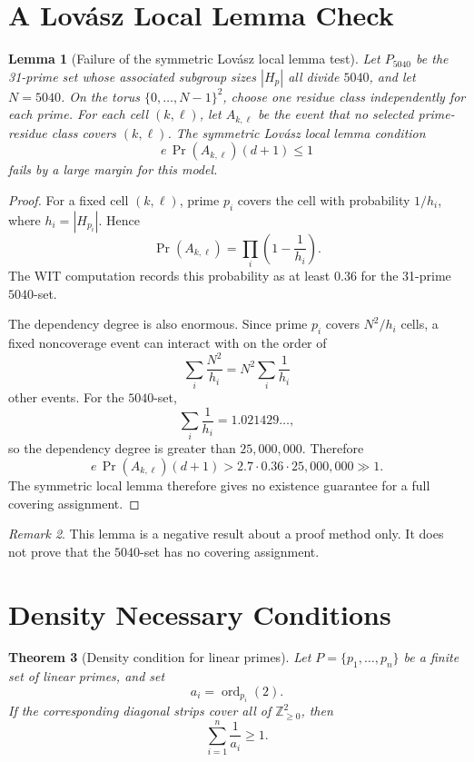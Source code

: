 \documentclass[11pt]{article}
\newtheorem{theorem}{Theorem}[section]
\newtheorem{lemma}[theorem]{Lemma}
\theoremstyle{definition}
\theoremstyle{remark}
\newtheorem{remark}[theorem]{Remark}
\DeclareMathOperator{\ord}{ord}
\begin{document}
\section{A Lov\'asz Local Lemma Check}

\begin{lemma}[Failure of the symmetric Lov\'asz local lemma test]
Let \(P_{5040}\) be the 31-prime set whose associated subgroup sizes
\(|H_p|\) all divide \(5040\), and let \(N=5040\).  On the torus
\(\{0,\ldots,N-1\}^2\), choose one residue class independently for each prime.
For each cell \((k,\ell)\), let \(A_{k,\ell}\) be the event that no selected
prime-residue class covers \((k,\ell)\).  The symmetric Lov\'asz local lemma
condition
\[
        e\,\Pr(A_{k,\ell})(d+1)\leq 1
\]
fails by a large margin for this model.
\end{lemma}

\begin{proof}
For a fixed cell \((k,\ell)\), prime \(p_i\) covers the cell with probability
\(1/h_i\), where \(h_i=|H_{p_i}|\).  Hence
\[
        \Pr(A_{k,\ell})
        =
        \prod_i\left(1-\frac1{h_i}\right).
\]
The WIT computation records this probability as at least \(0.36\) for the
31-prime \(5040\)-set.

The dependency degree is also enormous.  Since prime \(p_i\) covers
\(N^2/h_i\) cells, a fixed noncoverage event can interact with on the order of
\[
        \sum_i \frac{N^2}{h_i}
        =
        N^2\sum_i \frac1{h_i}
\]
other events.  For the \(5040\)-set,
\[
        \sum_i \frac1{h_i}=1.021429\ldots,
\]
so the dependency degree is greater than \(25{,}000{,}000\).  Therefore
\[
        e\,\Pr(A_{k,\ell})(d+1)
        >
        2.7\cdot 0.36\cdot 25{,}000{,}000
        \gg 1.
\]
The symmetric local lemma therefore gives no existence guarantee for a full
covering assignment.
\end{proof}

\begin{remark}
This lemma is a negative result about a proof method only.  It does not prove
that the \(5040\)-set has no covering assignment.
\end{remark}

\section{Density Necessary Conditions}

\begin{theorem}[Density condition for linear primes]
Let \(P=\{p_1,\ldots,p_n\}\) be a finite set of linear primes, and set
\[
        a_i=\ord_{p_i}(2).
\]
If the corresponding diagonal strips cover all of \(\mathbb Z_{\geq 0}^2\),
then
\[
        \sum_{i=1}^n \frac1{a_i}\geq 1.
\]
\end{theorem}
\end{document}
